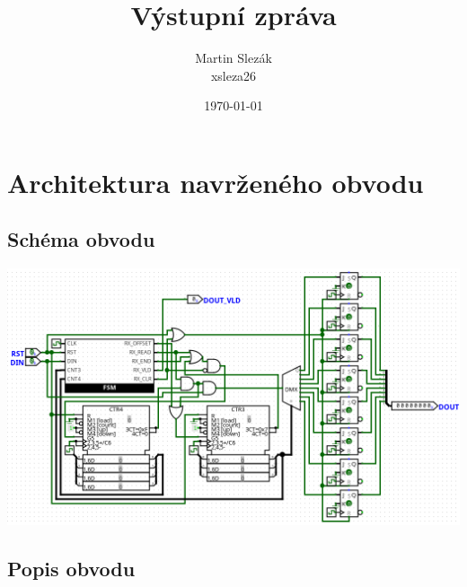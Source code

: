 \documentclass{article}
\title{Výstupní zpráva}
\author{Martin Slezák \\ xsleza26}
\date{\today}
\begin{document}
\maketitle

	\section{Architektura navrženého obvodu}
	\subsection{Schéma obvodu}
	\includegraphics[scale=0.5778]{"./src/rlc.png"}

	\subsection{Popis obvodu}
\end{document}
